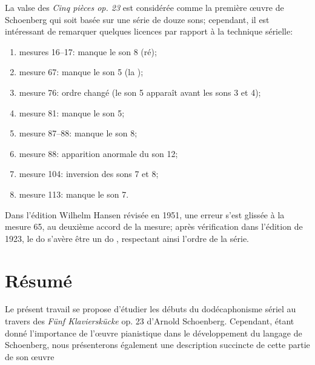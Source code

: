 \documentclass[11pt,a4paper]{scrreprt}
\begin{document}
La valse des \emph{Cinq pièces op. 23} est considérée comme la première \oe{}uvre de Schoenberg qui soit basée sur une série de douze sons; cependant, il est intéressant de remarquer quelques \og{} licences \fg{} par rapport à la technique sérielle:
\begin{enumerate}[a{}.]
\item mesures 16--17: manque le son 8 (ré);
\item mesure 67: manque le son 5 (la \fetaflat{});
\item mesure 76: ordre changé (le son 5 apparaît avant les sons 3 et 4);
\item mesure 81: manque le son 5;
\item mesure 87--88: manque le son 8;
\item mesure 88: apparition anormale du son 12;
\item mesure 104: inversion des sons 7 et 8;
\item mesure 113: manque le son 7.
\end{enumerate}

Dans l'édition Wilhelm Hansen révisée en 1951, une erreur s'est glissée à la mesure 65, au deuxième accord de la mesure; après vérification dans l'édition de 1923, le do \fetaflat{} s'avère être un do \fetanatural{} , respectant ainsi l'ordre de la série.


\nocite{schoenberg:op23} \nocite{tranchefort1987} \nocite{oxford1989}

\clearpage

\nocite{bosseur1992,oxford1989,griffiths1992,tranchefort1987,howeler1949,rostand1970,schoenberg:op23,stuckenschmidt1968,stuckenschmidt1951,schoenberg1971,michels1990,leibowitz1969}

\printbibliography
\chapter*{Résumé}
Le présent travail se propose d'étudier les débuts du dodécaphonisme sériel au travers des \emph{Fünf Klavierskücke} op. 23 d'Arnold Schoenberg.
Cependant, étant donné l'importance de l'\oe{}uvre pianistique dans le développement du langage de Schoenberg, nous présenterons également une description succincte de cette partie de son \oe{}uvre 



\tableofcontents
\end{document}
